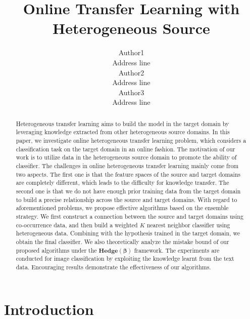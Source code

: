 \documentclass{article} %
\theoremstyle{remark}
\theoremstyle{definition}
\begin{document}
%
\title{Online Transfer Learning with Heterogeneous Source}
\author{Author1\\ Address line\\
\And Author2 \\ Address line\\
\And Author3 \\ Address line\\
}
\maketitle
\begin{abstract}
Heterogeneous transfer learning aims to build the model in the target domain by leveraging knowledge extracted from other heterogeneous source domains.
In this paper, we investigate online heterogeneous transfer learning problem, which considers a classification task on the target domain in an online fashion.
The motivation of our work is to utilize data in the heterogeneous source domain to promote the ability of classifier.
The challenges in online heterogeneous transfer learning mainly come from two aspects.
The first one is that the feature spaces of the source and target domains are completely different, which leads to the difficulty for knowledge transfer.
The second one is that we do not have enough prior training data from the target domain to build a precise relationship across the source and target domains.
With regard to aforementioned problems, we propose effective algorithms based on the ensemble strategy.
We first construct a connection between the source and target domains using co-occurrence data, and then build a weighted $K$ nearest neighbor classifier using heterogeneous data.
Combining with the hypothesis trained in the target domain, we obtain the final classifier.
We also theoretically analyze the mistake bound of our proposed algorithms under the $\mathbf{Hedge(\beta)}$ framework.
The experiments are conducted for image classification by exploiting the knowledge learnt from the text data.
Encouraging results demonstrate the effectiveness of our algorithms.

\end{abstract}


\section{Introduction}
\end{document}
